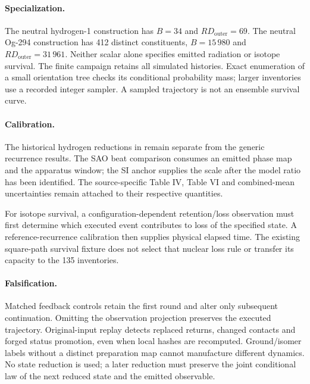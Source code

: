 \paragraph{Specialization.}
The neutral hydrogen-1 construction has \(B=34\) and
\(RD_{\mathrm{outer}}=69\). The neutral Og-294 construction has 412 distinct
constituents, \(B=15\,980\) and \(RD_{\mathrm{outer}}=31\,961\).
Neither scalar alone specifies emitted radiation or isotope survival.
The finite campaign retains all simulated histories. Exact enumeration of a
small orientation tree checks its conditional probability mass; larger
inventories use a recorded integer sampler. A sampled trajectory is not an
ensemble survival curve.

\paragraph{Calibration.}
The historical hydrogen reductions in
 remain separate from the generic
recurrence results. The SAO beat comparison consumes an emitted phase map and
the apparatus window; the SI anchor supplies the scale after the model ratio
has been identified. The source-specific Table IV, Table VI and combined-mean
uncertainties remain attached to their respective quantities.

For isotope survival, a configuration-dependent retention/loss observation
must first determine which executed event contributes to loss of the specified
state. A reference-recurrence calibration then supplies physical elapsed time.
The existing square-path survival fixture does not select that nuclear loss
rule or transfer its capacity to the 135 inventories.

\paragraph{Falsification.}
Matched feedback controls retain the first round and alter only subsequent
continuation. Omitting the observation projection preserves the executed
trajectory. Original-input
replay detects replaced returns, changed contacts and forged status promotion,
even when local hashes are recomputed. Ground/isomer labels without a distinct
preparation map cannot manufacture different dynamics. No state reduction is
used; a later reduction must preserve the joint conditional law of the next
reduced state and the emitted observable.

